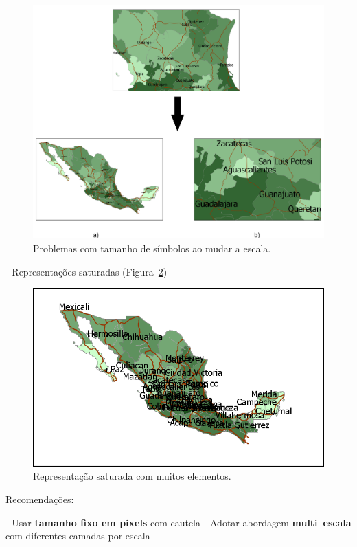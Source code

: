 \begin{figure}[!hbt]
\centering
\includegraphics[width=\columnwidth]{Visualizacao/ProblemasRepresentacionSimbolos.pdf}
\caption{\small Problemas com tamanho de símbolos ao mudar a escala.}
\label{Fig:ProblemasRepresentacionSimbolos} 
\end{figure}

- Representações saturadas (Figura~\ref{Fig:RepresentacionSaturada})

\begin{figure}[!hbt]
\centering
\includegraphics[width=.9\columnwidth]{Visualizacao/RepresentacionSaturada.png}
\caption{\small Representação saturada com muitos elementos.}
\label{Fig:RepresentacionSaturada} 
\end{figure}

Recomendações:

- Usar \textbf{tamanho fixo em pixels} com cautela
- Adotar abordagem \textbf{multi–escala} com diferentes camadas por escala

\pagestyle{empty}
